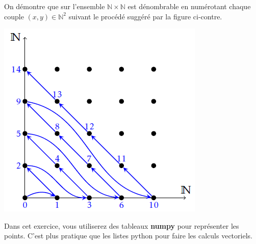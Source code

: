 



\begin{minipage}[c]{.7\linewidth}
On démontre que sur l'ensemble $\mathbb{N}\times \mathbb{N}$ est dénombrable en numérotant chaque couple $(x,y)\in\mathbb{N}^2$ suivant le procédé suggéré par la figure ci-contre.


\end{minipage}\hfill
\begin{minipage}[c]{.25\linewidth}
\begin{center}
\includegraphics[width=\linewidth]{fig_01}
\end{center}

\end{minipage}




Dans cet exercice, vous utiliserez des tableaux \textbf{numpy} pour représenter les points. C'est plus pratique que les 
listes python pour faire les calculs vectoriels.

